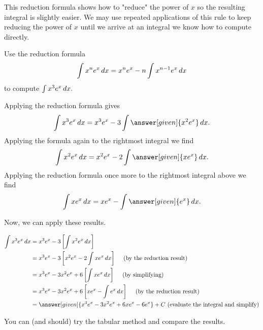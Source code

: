 \documentclass[noauthor]{ximera}
\begin{document}
This reduction formula shows how to "reduce" the power of $x$ so the resulting integral is slightly easier. We may use repeated applications of this rule to keep reducing the power of $x$ until we arrive at an integral we know how to compute directly.

\begin{example}
  Use the reduction formula
  \[
  \int x^n e^x \mathop{}\!d x = x^n e^x -n \int x^{n-1} e^x\mathop{}\!d x
  \]
  to compute $\int x^3 e^x \mathop{}\!d x.$

  \begin{explanation}
  Applying the reduction formula gives
    \[
    \int x^3 e^x \d x = x^3e^x -3\int \answer[given]{x^2 e^x}\d x.
    \]
    Applying the formula again to the rightmost integral we find
    \[
    \int x^{2} e^x\d x = x^2e^x - 2 \int \answer[given]{x e^x}\d x.
    \]
    Applying the reduction formula once more to the rightmost integral above we find
    \[
    \int x e^x\d x =xe^x - \int \answer[given]{e^x}\d x.
    \]

Now, we can apply these results.

\begin{align*}
        \int x^3 e^x \d x& = x^3e^x -3 \left[\int x^2 e^x\d x\right] \\
    &= x^3e^x -3 \left[    x^2e^x - 2 \int x e^x\d x     \right] \quad \textrm{ (by the reduction result)} \\
    &= x^3e^x - 3x^2e^x+6\left[ \int xe^x \d x \right] \quad \textrm{ (by simplifying)} \\
    &= x^3e^x - 3x^2e^x+6\left[ xe^x - \int  e^x \d x \right] \quad \textrm{ (by the reduction result)} \\
    & = \answer[given]{x^3e^x - 3x^2e^x+6 xe^x -6e^x} +C \textrm{ (evaluate the integral and simplify)}
\end{align*}

You can (and should) try the tabular method and compare the results.
  \end{explanation}
\end{example}

\end{document}
